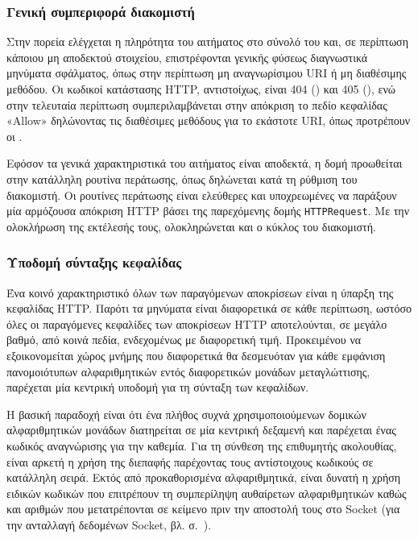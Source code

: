 \subsubsection{Γενική συμπεριφορά διακομιστή}

Στην πορεία ελέγχεται η πληρότητα του αιτήματος στο σύνολό του και, σε περίπτωση
κάποιου μη αποδεκτού στοιχείου, επιστρέφονται γενικής φύσεως διαγνωστικά
μηνύματα σφάλματος, όπως στην περίπτωση μη αναγνωρίσιμου URI ή μη διαθέσιμης
μεθόδου. Οι κωδικοί κατάστασης HTTP, αντιστοίχως, είναι 404 () και
405 (), ενώ στην τελευταία περίπτωση συμπεριλαμβάνεται
στην απόκριση το πεδίο κεφαλίδας «Allow» δηλώνοντας τις διαθέσιμες μεθόδους για
το εκάστοτε URI, όπως προτρέπουν οι \textcite[66]{rfc2616}.

Εφόσον τα γενικά χαρακτηριστικά του αιτήματος είναι αποδεκτά, η δομή προωθείται
στην κατάλληλη ρουτίνα περάτωσης, όπως δηλώνεται κατά τη ρύθμιση του διακομιστή.
Οι ρουτίνες περάτωσης είναι ελεύθερες και υποχρεωμένες να παράξουν μία
αρμόζουσα απόκριση HTTP βάσει της παρεχόμενης δομής \verb~HTTPRequest~.
Με την ολοκλήρωση της εκτέλεσής τους, ολοκληρώνεται και ο κύκλος του διακομιστή.


\subsubsection{Υποδομή σύνταξης κεφαλίδας}
\label{ssubsec:network:header-compile}

Ένα κοινό χαρακτηριστικό όλων των παραγόμενων αποκρίσεων είναι η ύπαρξη της
κεφαλίδας HTTP. Παρότι τα μηνύματα είναι διαφορετικά σε κάθε περίπτωση, ωστόσο
όλες οι παραγόμενες κεφαλίδες των αποκρίσεων HTTP αποτελούνται, σε μεγάλο βαθμό,
από κοινά πεδία, ενδεχομένως με διαφορετική τιμή. Προκειμένου να εξοικονομείται
χώρος μνήμης που διαφορετικά θα δεσμευόταν για κάθε εμφάνιση πανομοιότυπων
αλφαριθμητικών εντός διαφορετικών μονάδων μεταγλώττισης, παρέχεται μία κεντρική
υποδομή για τη σύνταξη των κεφαλίδων.

Η βασική παραδοχή είναι ότι ένα πλήθος συχνά χρησιμοποιούμενων δομικών
αλφαριθμητικών μονάδων διατηρείται σε μία κεντρική δεξαμενή και παρέχεται ένας
κωδικός αναγνώρισης για την καθεμία. Για τη σύνθεση της επιθυμητής ακολουθίας,
είναι αρκετή η χρήση της διεπαφής παρέχοντας τους αντίστοιχους κωδικούς σε
κατάλληλη σειρά. Εκτός από προκαθορισμένα αλφαριθμητικά, είναι δυνατή η χρήση
ειδικών κωδικών που επιτρέπουν τη συμπερίληψη αυθαίρετων αλφαριθμητικών καθώς
και αριθμών που μετατρέπονται σε κείμενο πριν την αποστολή τους στο Socket
(για την ανταλλαγή δεδομένων Socket, βλ. 
σ.~\pageref{ssubsec:network:rx-tx-buffer}).

